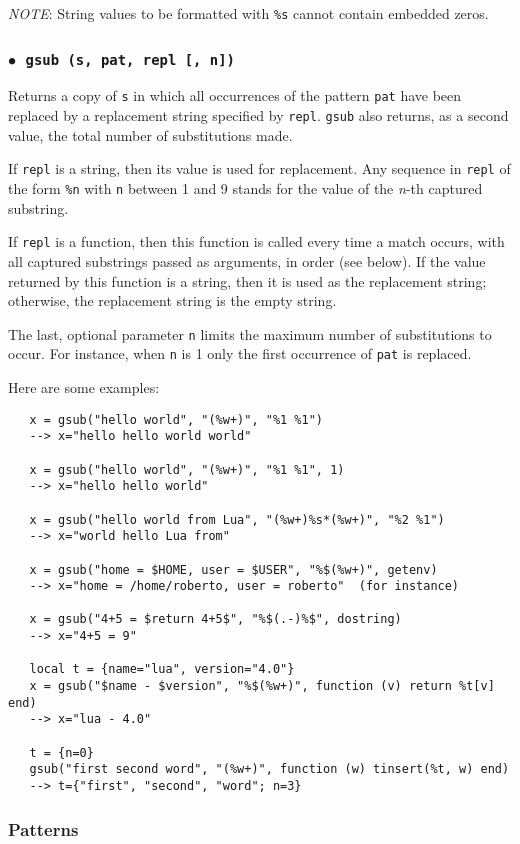 \documentclass[11pt]{article}
\makeatletter
\newcommand{\M}[1]{{\rm\emph{#1}}}
\newcommand{\T}[1]{{\tt #1}}
\newcommand{\DefLIB}[1]{\index{#1@{\tt #1}}}
\newcommand{\ff}{$\bullet$\ }
\newcommand{\NOTE}{\par\medskip\noindent\emph{NOTE}: }
\makeatother
\begin{document}
\NOTE
String values to be formatted with
\verb|%s| cannot contain embedded zeros.

\subsubsection*{\ff \T{gsub (s, pat, repl [, n])}}
\DefLIB{gsub}
Returns a copy of \verb|s|
in which all occurrences of the pattern \verb|pat| have been
replaced by a replacement string specified by \verb|repl|.
\verb|gsub| also returns, as a second value,
the total number of substitutions made.

If \verb|repl| is a string, then its value is used for replacement.
Any sequence in \verb|repl| of the form \verb|%n|
with \verb|n| between 1 and 9
stands for the value of the \M{n}-th captured substring.

If \verb|repl| is a function, then this function is called every time a
match occurs, with all captured substrings passed as arguments,
in order (see below).
If the value returned by this function is a string,
then it is used as the replacement string;
otherwise, the replacement string is the empty string.

The last, optional parameter \verb|n| limits
the maximum number of substitutions to occur.
For instance, when \verb|n| is 1 only the first occurrence of
\verb|pat| is replaced.

Here are some examples:
\begin{verbatim}
   x = gsub("hello world", "(%w+)", "%1 %1")
   --> x="hello hello world world"

   x = gsub("hello world", "(%w+)", "%1 %1", 1)
   --> x="hello hello world"

   x = gsub("hello world from Lua", "(%w+)%s*(%w+)", "%2 %1")
   --> x="world hello Lua from"

   x = gsub("home = $HOME, user = $USER", "%$(%w+)", getenv)
   --> x="home = /home/roberto, user = roberto"  (for instance)

   x = gsub("4+5 = $return 4+5$", "%$(.-)%$", dostring)
   --> x="4+5 = 9"

   local t = {name="lua", version="4.0"}
   x = gsub("$name - $version", "%$(%w+)", function (v) return %t[v] end)
   --> x="lua - 4.0"

   t = {n=0}
   gsub("first second word", "(%w+)", function (w) tinsert(%t, w) end)
   --> t={"first", "second", "word"; n=3}
\end{verbatim}


\subsubsection*{Patterns} \label{pm}
\end{document}
